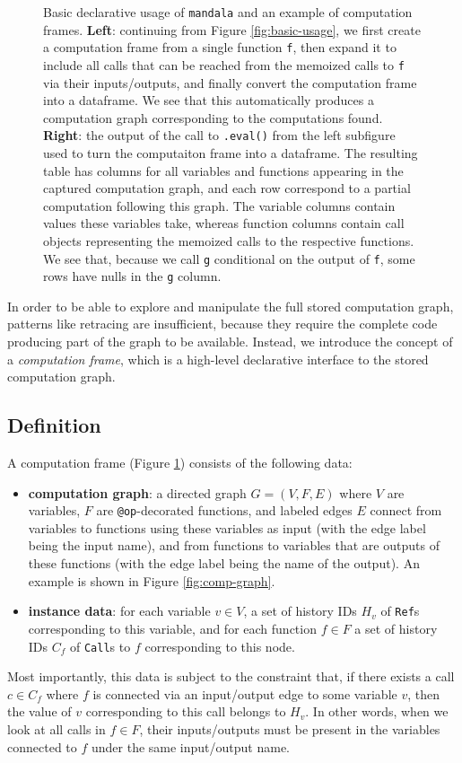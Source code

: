 \documentclass{article} %
\begin{document}
\begin{figure}[h]
\begin{subfigure}{0.47\textwidth}
\end{subfigure}
\caption{Basic declarative usage of \texttt{mandala} and an example of
computation frames. \textbf{Left}: continuing from Figure
\ref{fig:basic-usage}, we first create a computation frame from a single
function \texttt{f}, then expand it to include all calls that can be reached
from the memoized calls to \texttt{f} via their inputs/outputs, and finally
convert the computation frame into a dataframe. We see that this automatically
produces a computation graph corresponding to the computations found. \textbf{Right}:
the output of the call to \texttt{.eval()} from the left subfigure used to turn
the computaiton frame into a dataframe. The resulting table has columns for all
variables and functions appearing in the captured computation graph, and each
row correspond to a partial computation following this graph. The variable
columns contain values these variables take, whereas function columns contain
call objects representing the memoized calls to the respective functions. We see
that, because we call \texttt{g} conditional on the output of \texttt{f}, some
rows have nulls in the \texttt{g} column.}
\label{fig:cf}
\end{figure}

In order to be able to explore and manipulate the full stored computation graph,
patterns like retracing are insufficient, because they require the complete code
producing part of the graph to be available. Instead, we introduce the concept
of a \emph{computation frame}, which is a high-level declarative interface to
the stored computation graph. 

\subsection{Definition}
\label{subsection:cf-definition}
A computation frame (Figure \ref{fig:cf}) consists of the following data:
\begin{itemize}
\item \textbf{computation graph}: a directed graph $G=(V,F,E)$ where $V$ are
variables, $F$ are \texttt{@op}-decorated functions, and labeled edges $E$
connect from variables to functions using these variables as input (with the
edge label being the input name), and from functions to variables that are
outputs of these functions (with the edge label being the name of the output). An example is shown in Figure \ref{fig:comp-graph}.
\item \textbf{instance data}: for each variable $v\in V$, a set of history
IDs $H_v$ of \texttt{Ref}s corresponding to this variable, and for each function
$f\in F$ a set of history IDs $C_f$ of \texttt{Call}s to $f$ corresponding to
this node. 
\end{itemize}
Most importantly, this data is subject to the constraint that, if there exists a
call $c\in C_f$ where $f$ is connected via an input/output edge to some variable
$v$, then the value of $v$ corresponding to this call belongs to $H_v$. In other
words, when we look at all calls in $f\in F$, their inputs/outputs  must be
present in the variables connected to $f$ under the same input/output name. 
\end{document}
